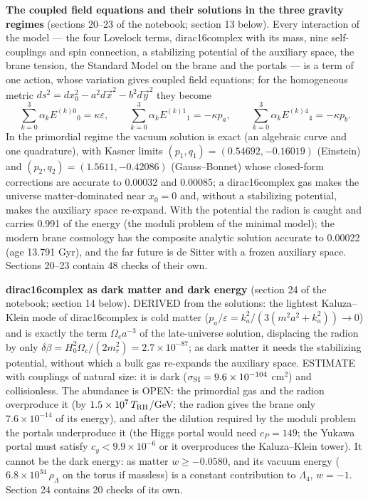 \documentclass[10pt,a4paper]{article}
\begin{document}
\textbf{The coupled field equations and their solutions in the three gravity regimes} (sections 20–23 of the notebook; section 13 below). Every interaction of the model — the four Lovelock terms, dirac16complex with its mass, nine self-couplings and spin connection, a stabilizing potential of the auxiliary space, the brane tension, the Standard Model on the brane and the portals — is a term of one action, whose variation gives coupled field equations; for the homogeneous metric $ds^2=dx_0^2-a^2d\vec x^2-b^2d\vec y^2$ they become
\begin{equation*}
\sum_{k=0}^{3}\alpha_kE^{(k)0}{}_0=\kappa\varepsilon,\qquad \sum_{k=0}^{3}\alpha_kE^{(k)1}{}_1=-\kappa p_a,\qquad \sum_{k=0}^{3}\alpha_kE^{(k)4}{}_4=-\kappa p_b .
\end{equation*}
In the primordial regime the vacuum solution is exact (an algebraic curve and one quadrature), with Kasner limits $(p_1,q_1)=(0.54692,-0.16019)$ (Einstein) and $(p_2,q_2)=(1.5611,-0.42086)$ (Gauss–Bonnet) whose closed-form corrections are accurate to 0.00032 and 0.00085; a dirac16complex gas makes the universe matter-dominated near $x_0=0$ and, without a stabilizing potential, makes the auxiliary space re-expand. With the potential the radion is caught and carries 0.991 of the energy (the moduli problem of the minimal model); the modern brane cosmology has the composite analytic solution accurate to 0.00022 (age 13.791 Gyr), and the far future is de Sitter with a frozen auxiliary space. Sections 20–23 contain 48 checks of their own.

\textbf{dirac16complex as dark matter and dark energy} (section 24 of the notebook; section 14 below). DERIVED from the solutions: the lightest Kaluza–Klein mode of dirac16complex is cold matter ($p_a/\varepsilon=k_a^2/(3(m^2a^2+k_a^2))\to0$) and is exactly the term $\Omega_ca^{-3}$ of the late-universe solution, displacing the radion by only $\delta\beta=H_0^2\Omega_c/(2m_r^2)=2.7\times10^{-87}$; as dark matter it needs the stabilizing potential, without which a bulk gas re-expands the auxiliary space. ESTIMATE with couplings of natural size: it is dark ($\sigma_{\rm SI}=9.6\times10^{-104}$ cm$^2$) and collisionless. The abundance is OPEN: the primordial gas and the radion overproduce it (by $1.5\times10^{7}\,T_{\rm RH}$/GeV; the radion gives the brane only $7.6\times10^{-14}$ of its energy), and after the dilution required by the moduli problem the portals underproduce it (the Higgs portal would need $c_P=149$; the Yukawa portal must satisfy $c_y<9.9\times10^{-6}$ or it overproduces the Kaluza–Klein tower). It cannot be the dark energy: as matter $w\ge-0.0580$, and its vacuum energy ($6.8\times10^{34}\,\rho_\Lambda$ on the torus if massless) is a constant contribution to $\Lambda_4$, $w=-1$. Section 24 contains 20 checks of its own.
\end{document}
